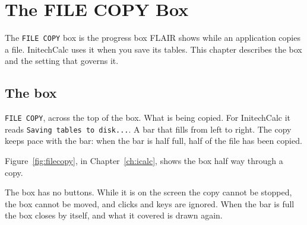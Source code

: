 \chapter{The FILE COPY Box}
\label{ch:filecopy}

The \texttt{FILE COPY} box is the progress box FLAIR shows while an
application copies a file.  InitechCalc uses it when you save its tables.
This chapter describes the box and the setting that governs it.

\section{The box}
\texttt{FILE COPY}, across the top of the box.
What is being copied.  For InitechCalc it reads
\texttt{Saving tables to disk...}.
A bar that fills from left to right.  The copy keeps
pace with the bar: when the bar is half full, half of the file has been
copied.

Figure~\ref{fig:filecopy}, in Chapter~\ref{ch:icalc}, shows the box half way through a
copy.

The box has no buttons.  While it is on the screen the copy cannot be
stopped, the box cannot be moved, and clicks and keys are ignored.  When
the bar is full the box closes by itself, and what it covered is drawn
again.

